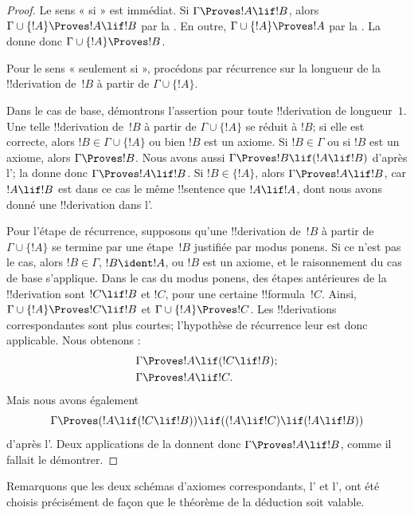 \documentclass[11pt,a4paper,openany]{memoir}
\begin{document}
\begin{proof}
Le sens « si » est immédiat. Si $\Gamma \Proves !A \lif !B$, alors
$\Gamma \cup \{!A\} \Proves !A \lif !B$ par la
. En outre,
$\Gamma \cup \{!A\} \Proves !A$ par la
. La  donne donc
$\Gamma \cup \{!A\} \Proves !B$.

Pour le sens « seulement si », procédons par récurrence sur la longueur
de la !!{derivation} de~$!B$ à partir de $\Gamma \cup \{!A\}$.

Dans le cas de base, démontrons l'assertion pour toute !!{derivation}
de longueur~$1$. Une telle !!{derivation} de~$!B$ à partir de
$\Gamma \cup \{!A\}$ se réduit à $!B$; si elle est correcte, alors
$!B \in \Gamma \cup \{!A\}$ ou bien $!B$ est un axiome. Si
$!B \in \Gamma$ ou si $!B$ est un axiome, alors
$\Gamma \Proves !B$. Nous avons aussi
$\Gamma \Proves !B \lif (!A \lif !B)$ d'après
l'; la  donne donc
$\Gamma \Proves !A \lif !B$. Si $!B \in \{!A\}$, alors
$\Gamma \Proves !A \lif !B$, car $!A \lif !B$ est dans ce cas le
même !!{sentence} que $!A \lif !A$, dont nous avons donné une
!!{derivation} dans l'.

Pour l'étape de récurrence, supposons qu'une !!{derivation} de~$!B$ à
partir de $\Gamma \cup \{!A\}$ se termine par une étape~$!B$ justifiée
par modus ponens. Si ce n'est pas le cas, alors $!B \in \Gamma$,
$!B \ident !A$, ou $!B$ est un axiome, et le raisonnement du cas de
base s'applique. Dans le cas du modus ponens, des étapes antérieures de
la !!{derivation} sont $!C \lif !B$ et $!C$, pour une certaine
!!{formula}~$!C$. Ainsi,
$\Gamma \cup \{!A\} \Proves !C \lif !B$ et
$\Gamma \cup \{!A\} \Proves !C$. Les !!{derivation}s correspondantes
sont plus courtes; l'hypothèse de récurrence leur est donc applicable.
Nous obtenons :
\begin{align*}
  & \Gamma \Proves !A \lif (!C \lif !B); \\
  & \Gamma \Proves !A \lif !C.
\end{align*}
Mais nous avons également
\[
\Gamma \Proves (!A \lif (!C \lif !B)) \lif
((!A \lif !C) \lif (!A \lif !B))
\]
d'après l'. Deux applications de la
 donnent donc $\Gamma \Proves !A \lif !B$, comme il
fallait le démontrer.
\end{proof}

Remarquons que les deux schémas d'axiomes correspondants,
l' et l', ont été choisis
précisément de façon que le théorème de la déduction soit valable.
\end{document}
